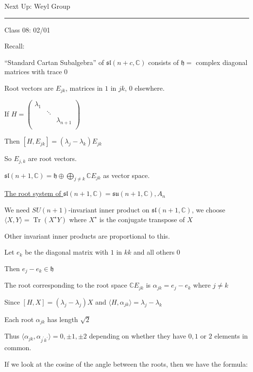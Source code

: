 \documentclass{article}
\theoremstyle{definition}
\newcommand{\Tr}{\operatorname{Tr}}
\begin{document}
Next Up: Weyl Group

\hfil
\hrule

Class 08: 02/01

Recall:

``Standard Cartan Subalgebra'' of \(\mathfrak{sl}(n+c,\mathbb{C}) \) consists of \(\mathfrak{h} = \) complex diagonal matrices with trace \(0\) 

Root vectors are \(E_{jk}\), matrices in \(1\) in \(jk\), \(0\) elsewhere.

If \(H=\begin{pmatrix}
    \lambda _1 &  &   \\
     & \ddots &   \\
     &  &  \lambda_{n+1} \\
\end{pmatrix}\) 

Then \([H,E_{jk}]=(\lambda_j - \lambda_k)E_{jk}\) 

So \(E_{j,k}\) are root vectors.

\(\mathfrak{sl}(n+1,\mathbb{C}) = \mathfrak{h} \oplus  \bigoplus_{j \neq k}^{} \mathbb{C} E_{jk} \) as vector space. 

\underline{The root system of \(\mathfrak{sl} (n+1,\mathbb{C} )= \mathfrak{su}(n+1,\mathbb{C}),A_n\) }

We need \(SU(n+1)\)-invariant inner product on \(\mathfrak{sl} (n+1,\mathbb{C})\), we choose \(\langle X,Y \rangle = \Tr (X^{\star} Y)\) where \(X^{\star} \) is the conjugate transpose of \(X\) 

Other invariant inner products are proportional to this.

Let \(e_k\) be the diagonal matrix with \(1\) in \(kk\) and all others \(0\) 

Then \(e_j - e_k \in \mathfrak{h} \) 

The root corresponding to the root space \(\mathbb{C} E_{jk}\) is \(\alpha _{jk} = e_j - e_k\) where \(j \neq k\) 

Since \([H,X]=(\lambda_j - \lambda_j)X\) and \(\langle H, \alpha_{jk} \rangle = \lambda _j - \lambda _k \)  

Each root \(\alpha _{jk}\) has length \(\sqrt{2} \) 

Thus \(\langle \alpha _{jk} , \alpha_{j^{\prime} k^{\prime} } \rangle = 0, \pm 1, \pm 2\) depending on whether they have \(0,1\) or \(2\) elements in common.

If we look at the cosine of the angle between the roots, then we have the formula:
\end{document}
